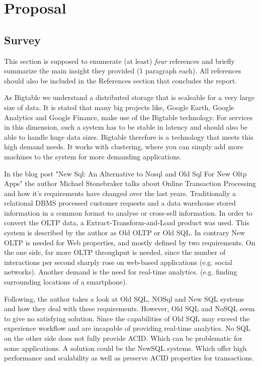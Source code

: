 \newpage
\section{Proposal}

\subsection{Survey}
This section is supposed to enumerate (at least) \emph{four} references and
briefly summarize the main insight they provided (1 paragraph each). All
references should also be included in the References section that concludes the
report.

\begin{packed_enum}
\item
As Bigtable we understand a distributed storage that is scaleable for a very large size of data. It is stated that many big projects like, Google Earth, Google Analytics and Google Finance, make use of the Bigtable technology. For services in this dimension, such a system has to be stable in latency and should also be able to handle huge data sizes. Bigtable therefore is a technology that meets this high demand needs. It works with clustering, where you can simply add more machines to the system for more demanding applications. \cite{Chang2008}
\item 
In the blog post "New Sql: An Alternative to Nosql and Old Sql For New Oltp Apps" the author Michael Stonebraker talks about Online
Transaction Processing and how it's requirements have changed over the last years. Traditionally a relational DBMS processed customer requests and a data warehouse stored information in a common format to analyse or cross-sell information. In order to convert the OLTP data, a Extract-Transform-and-Load product was used. This system is described by the author as Old OLTP or Old SQL. In contrary New OLTP is needed for Web properties, and mostly defined by two requirements. On the one side, far more OLTP throughput is needed, since the number of interactions per second
sharply rose on web-based applications (e.g. social networks). Another demand is the need for real-time analytics. (e.g. finding surrounding locations of a smartphone).

Following, the author takes a look at Old SQL, NOSql and New SQL systems and how they deal with these requirements. However, Old SQL and NoSQL seem to give no satisfying solution. Since the capabilities of Old SQL may exceed the experience workflow and are incapable of providing real-time analytics.
No SQL on the other side does not fully provide ACID. Which can be problematic for some applications. A solution could be the NewSQL systems. Which offer high performance and scalability as well as preserve ACID properties for transactions. \cite{Stonebraker2011}


\end{packed_enum}
